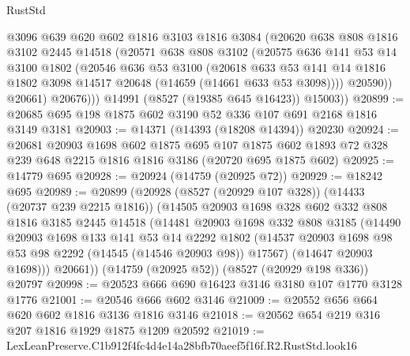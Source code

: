 \begin{lexlean}{RustStd}
\begin{coremodule}
              @3096
              @639
              @620
              @602
              @1816
              @3103
              @1816
              @3084
              (@20620
                @638
                @808
                @1816
                @3102
                @2445
                @14518
                (@20571
                  @638
                  @808
                  @3102
                  (@20575
                    @636
                    @141
                    @53
                    @14
                    @3100
                    @1802
                    (@20546
                      @636
                      @53
                      @3100
                      (@20618
                        @633
                        @53
                        @141
                        @14
                        @1816
                        @1802
                        @3098
                        @14517
                        @20648
                        (@14659 (@14661 @633 @53 @3098))))
                    @20590))
                @20661)
              @20676)))
        @14991
        (@8527 (@19385 @645 @16423))
        @15003))
@20899 := @20685 @695 @198 @1875 @602 @3190 @52 @336 @107 @691 @2168 @1816 @3149 @3181
@20903 := @14371 (@14393 (@18208 @14394)) @20230
@20924 := @20681
    @20903
    @1698
    @602
    @1875
    @695
    @107
    @1875
    @602
    @1893
    @72
    @328
    @239
    @648
    @2215
    @1816
    @1816
    @3186
    (@20720 @695 @1875 @602)
@20925 := @14779 @695
@20928 := @20924 (@14759 (@20925 @72))
@20929 := @18242 @695
@20989 := @20899
    (@20928
      (@8527 (@20929 @107 @328))
      (@14433 (@20737 @239 @2215 @1816))
      (@14505
        @20903
        @1698
        @328
        @602
        @332
        @808
        @1816
        @3185
        @2445
        @14518
        (@14481
          @20903
          @1698
          @332
          @808
          @3185
          (@14490
            @20903
            @1698
            @133
            @141
            @53
            @14
            @2292
            @1802
            (@14537 @20903 @1698 @98 @53 @98 @2292 (@14545 (@14546 @20903 @98)) @17567)
            (@14647 @20903 @1698)))
        @20661))
    (@14759 (@20925 @52))
    (@8527 (@20929 @198 @336))
    @20797
@20998 := @20523 @666 @690 @16423 @3146 @3180 @107 @1770 @3128 @1776
@21001 := @20546 @666 @602 @3146
@21009 := @20552 @656 @664 @620 @602 @1816 @3136 @1816 @3146
@21018 := @20562 @654 @219 @316 @207 @1816 @1929 @1875 @1209 @20592
@21019 := LexLeanPreserve.C1b912f4fc4d4e14a28bfb70aeef5f16f.R2.RustStd.look16

\end{coremodule}
\end{lexlean}
